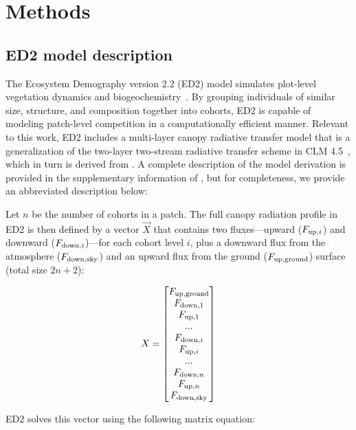 \section{Methods}

\subsection{ED2 model description}

The Ecosystem Demography version 2.2 (ED2) model simulates plot-level vegetation dynamics and biogeochemistry~\citep{moorcroft_2001_method, medvigy2009mechanistic, longo_2019_ed1}.
By grouping individuals of similar size, structure, and composition together into cohorts, ED2 is capable of modeling patch-level competition in a computationally efficient manner.
Relevant to this work, ED2 includes a multi-layer canopy radiative transfer model that is a generalization of the two-layer two-stream radiative transfer scheme in CLM 4.5~\citep{clm45_note}, which in turn is derived from \citet{sellers1985canopy}.
A complete description of the model derivation is provided in the supplementary information of \citet{longo_2019_ed1}, but for completeness, we provide an abbreviated description below:

Let $n$ be the number of cohorts in a patch.
The full canopy radiation profile in ED2 is then defined by a vector $\vec{X}$ that contains two fluxes---upward ($\relax{F}_{\mathrm{up},i}$) and downward ($F_{\mathrm{down},i}$)---for each cohort level $i$, plus a downward flux from the atmosphere ($F_{\mathrm{down},\mathrm{sky}}$) and an upward flux from the ground ($F_{\mathrm{up},\mathrm{ground}}$) surface (total size $2n + 2$):

\begin{equation}
  \relax{X} =
  \begin{bmatrix}
    F_{\mathrm{up},\mathrm{ground}} \\
    F_{\mathrm{down},1} \\
    F_{\mathrm{up}, 1} \\
    ... \\
    F_{\mathrm{down},i} \\
    F_{\mathrm{up},i} \\
    ... \\
    F_{\mathrm{down},n} \\
    F_{\mathrm{up},n} \\
    F_{\mathrm{down},\mathrm{sky}}
  \end{bmatrix}
\end{equation}

ED2 solves this vector using the following matrix equation:

